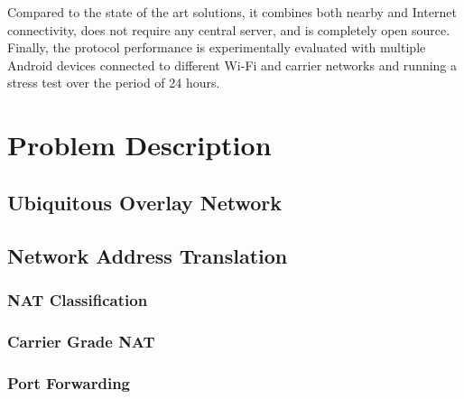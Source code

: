 Compared to the state of the art solutions, it combines both nearby and Internet connectivity, does not require any central server, and is completely open source. Finally, the protocol performance is experimentally evaluated with multiple Android devices connected to different Wi-Fi and carrier networks and running a stress test over the period of 24 hours.

\chapter{Problem Description}

\section{Ubiquitous Overlay Network}







\section{Network Address Translation}

\subsection{NAT Classification}

\subsection{Carrier Grade NAT}

\subsection{Port Forwarding}

